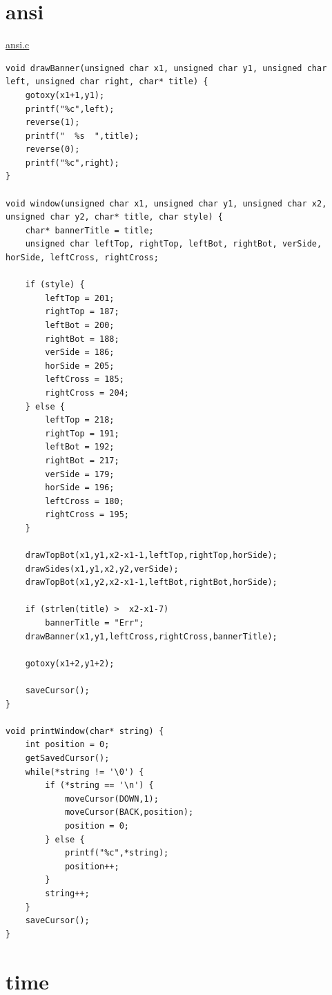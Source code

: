 \section{ansi}
\label{ansigammel}

\underline{ansi.c}
\begin{lstlisting}
void drawBanner(unsigned char x1, unsigned char y1, unsigned char left, unsigned char right, char* title) {
	gotoxy(x1+1,y1);
	printf("%c",left);
	reverse(1);
	printf("  %s  ",title);
	reverse(0);
	printf("%c",right);
}

void window(unsigned char x1, unsigned char y1, unsigned char x2, unsigned char y2, char* title, char style) {
	char* bannerTitle = title;
	unsigned char leftTop, rightTop, leftBot, rightBot, verSide, horSide, leftCross, rightCross;

	if (style) {
		leftTop = 201;
		rightTop = 187;
		leftBot = 200;
		rightBot = 188;
		verSide = 186;
		horSide = 205;
		leftCross = 185;
		rightCross = 204;
	} else {
		leftTop = 218;
		rightTop = 191;
		leftBot = 192;
		rightBot = 217;
		verSide = 179;
		horSide = 196;
		leftCross = 180;
		rightCross = 195;
	}
	
	drawTopBot(x1,y1,x2-x1-1,leftTop,rightTop,horSide);
	drawSides(x1,y1,x2,y2,verSide);
	drawTopBot(x1,y2,x2-x1-1,leftBot,rightBot,horSide);
	
	if (strlen(title) >  x2-x1-7)
		bannerTitle = "Err";
	drawBanner(x1,y1,leftCross,rightCross,bannerTitle);

	gotoxy(x1+2,y1+2);

	saveCursor();
}

void printWindow(char* string) {
	int position = 0;
	getSavedCursor();
	while(*string != '\0') {
		if (*string == '\n') {
			moveCursor(DOWN,1);
			moveCursor(BACK,position);
			position = 0;
		} else {
			printf("%c",*string);
			position++;
		}
		string++;
	}
	saveCursor();
}
\end{lstlisting}

\section{time}
\label{timegammel}

